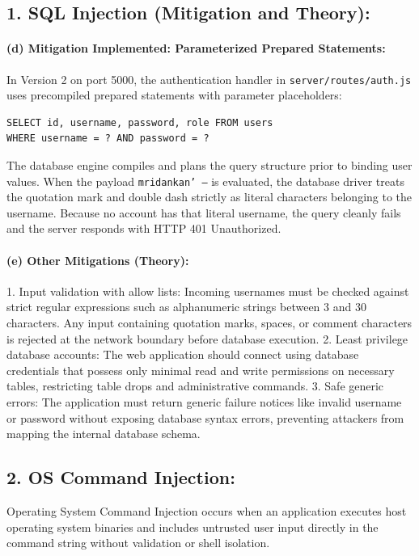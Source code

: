 \documentclass[11pt,a4paper]{article}
\begin{document}
\subsection*{1. SQL Injection (Mitigation and Theory):}

\paragraph*{(d) Mitigation Implemented: Parameterized Prepared Statements:}
In Version 2 on port 5000, the authentication handler in \texttt{server/routes/auth.js} uses precompiled prepared statements with parameter placeholders:
\begin{lstlisting}
SELECT id, username, password, role FROM users 
WHERE username = ? AND password = ?
\end{lstlisting}
The database engine compiles and plans the query structure prior to binding user values. When the payload \texttt{mridankan' --} is evaluated, the database driver treats the quotation mark and double dash strictly as literal characters belonging to the username. Because no account has that literal username, the query cleanly fails and the server responds with HTTP 401 Unauthorized.

\paragraph*{(e) Other Mitigations (Theory):}
1. Input validation with allow lists: Incoming usernames must be checked against strict regular expressions such as alphanumeric strings between 3 and 30 characters. Any input containing quotation marks, spaces, or comment characters is rejected at the network boundary before database execution.
2. Least privilege database accounts: The web application should connect using database credentials that possess only minimal read and write permissions on necessary tables, restricting table drops and administrative commands.
3. Safe generic errors: The application must return generic failure notices like invalid username or password without exposing database syntax errors, preventing attackers from mapping the internal database schema.

\vspace{12pt}
\subsection*{2. OS Command Injection:}
Operating System Command Injection occurs when an application executes host operating system binaries and includes untrusted user input directly in the command string without validation or shell isolation.
\end{document}
